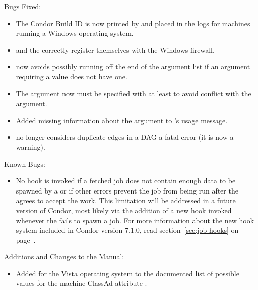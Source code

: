 \noindent Bugs Fixed:

\begin{itemize}

\item The Condor Build ID is now printed by  and placed 
  in the logs for machines running a Windows operating system.

\item {} and the  correctly register 
  themselves with the Windows firewall.

\item {} now avoids possibly running off the end
of the argument list if an argument requiring a value does not have one.

\item The   argument now must be
specified with at least  to avoid conflict with the
 argument.

\item Added missing information about the  argument to
's usage message.

\item {} no longer considers duplicate edges in a DAG a
fatal error (it is now a warning).

\end{itemize}

\noindent Known Bugs:

\begin{itemize}

\item No hook is invoked if a fetched job does not contain enough data
  to be spawned by a  or if other errors prevent the
  job from being run after the  agrees to accept the
  work.
  This limitation will be addressed in a future version of Condor,
  most likely via the addition of a new hook invoked whenever the
   fails to spawn a job.
  For more information about the new hook system included in Condor
  version 7.1.0, read section~\ref{sec:job-hooks} on
  page~\pageref{sec:job-hooks}.

\end{itemize}

\noindent Additions and Changes to the Manual:

\begin{itemize}

\item Added  for the Vista operating system to
  the documented list of possible values for the machine ClassAd
  attribute .

\end{itemize}

